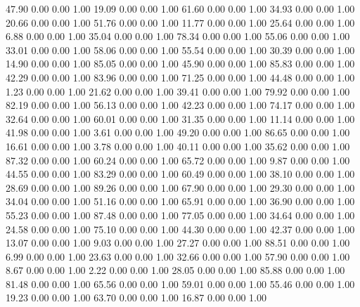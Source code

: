   47.90   0.00   0.00   1.00
   19.09   0.00   0.00   1.00
   61.60   0.00   0.00   1.00
   34.93   0.00   0.00   1.00
   20.66   0.00   0.00   1.00
   51.76   0.00   0.00   1.00
   11.77   0.00   0.00   1.00
   25.64   0.00   0.00   1.00
    6.88   0.00   0.00   1.00
   35.04   0.00   0.00   1.00
   78.34   0.00   0.00   1.00
   55.06   0.00   0.00   1.00
   33.01   0.00   0.00   1.00
   58.06   0.00   0.00   1.00
   55.54   0.00   0.00   1.00
   30.39   0.00   0.00   1.00
   14.90   0.00   0.00   1.00
   85.05   0.00   0.00   1.00
   45.90   0.00   0.00   1.00
   85.83   0.00   0.00   1.00
   42.29   0.00   0.00   1.00
   83.96   0.00   0.00   1.00
   71.25   0.00   0.00   1.00
   44.48   0.00   0.00   1.00
    1.23   0.00   0.00   1.00
   21.62   0.00   0.00   1.00
   39.41   0.00   0.00   1.00
   79.92   0.00   0.00   1.00
   82.19   0.00   0.00   1.00
   56.13   0.00   0.00   1.00
   42.23   0.00   0.00   1.00
   74.17   0.00   0.00   1.00
   32.64   0.00   0.00   1.00
   60.01   0.00   0.00   1.00
   31.35   0.00   0.00   1.00
   11.14   0.00   0.00   1.00
   41.98   0.00   0.00   1.00
    3.61   0.00   0.00   1.00
   49.20   0.00   0.00   1.00
   86.65   0.00   0.00   1.00
   16.61   0.00   0.00   1.00
    3.78   0.00   0.00   1.00
   40.11   0.00   0.00   1.00
   35.62   0.00   0.00   1.00
   87.32   0.00   0.00   1.00
   60.24   0.00   0.00   1.00
   65.72   0.00   0.00   1.00
    9.87   0.00   0.00   1.00
   44.55   0.00   0.00   1.00
   83.29   0.00   0.00   1.00
   60.49   0.00   0.00   1.00
   38.10   0.00   0.00   1.00
   28.69   0.00   0.00   1.00
   89.26   0.00   0.00   1.00
   67.90   0.00   0.00   1.00
   29.30   0.00   0.00   1.00
   34.04   0.00   0.00   1.00
   51.16   0.00   0.00   1.00
   65.91   0.00   0.00   1.00
   36.90   0.00   0.00   1.00
   55.23   0.00   0.00   1.00
   87.48   0.00   0.00   1.00
   77.05   0.00   0.00   1.00
   34.64   0.00   0.00   1.00
   24.58   0.00   0.00   1.00
   75.10   0.00   0.00   1.00
   44.30   0.00   0.00   1.00
   42.37   0.00   0.00   1.00
   13.07   0.00   0.00   1.00
    9.03   0.00   0.00   1.00
   27.27   0.00   0.00   1.00
   88.51   0.00   0.00   1.00
    6.99   0.00   0.00   1.00
   23.63   0.00   0.00   1.00
   32.66   0.00   0.00   1.00
   57.90   0.00   0.00   1.00
    8.67   0.00   0.00   1.00
    2.22   0.00   0.00   1.00
   28.05   0.00   0.00   1.00
   85.88   0.00   0.00   1.00
   81.48   0.00   0.00   1.00
   65.56   0.00   0.00   1.00
   59.01   0.00   0.00   1.00
   55.46   0.00   0.00   1.00
   19.23   0.00   0.00   1.00
   63.70   0.00   0.00   1.00
   16.87   0.00   0.00   1.00
